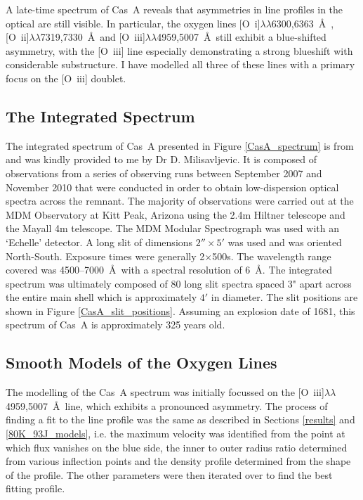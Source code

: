 A late-time spectrum of Cas~A reveals that asymmetries in line profiles in the optical are still visible.  In particular, the oxygen lines [O~{\sc i}]$\lambda\lambda$6300,6363~\AA\ , [O~{\sc ii}]$\lambda\lambda$7319,7330~\AA\  and [O~{\sc iii}]$\lambda\lambda$4959,5007~\AA\  still exhibit a blue-shifted asymmetry, with the [O~{\sc iii}] line especially demonstrating a strong blueshift with considerable substructure.  I have modelled all three of these lines with a primary focus on the [O~{\sc iii}] doublet.

\subsection{The Integrated Spectrum}

The integrated spectrum of Cas~A presented in Figure \ref{CasA_spectrum} is from \citet{Milisavljevic2013} and was kindly provided to me by Dr D. Milisavljevic.  It is composed of observations from a series of observing runs between September 2007 and November 2010 that were conducted in order to obtain low-dispersion optical spectra across the remnant.  The majority of observations were carried out at the MDM Observatory at Kitt Peak, Arizona using the 2.4m Hiltner telescope and the Mayall 4m telescope.  The MDM Modular Spectrograph was used with an `Echelle' detector.  A long slit of dimensions $2''\times5'$ was used and was oriented North-South.  Exposure times were generally 2$\times$500s.  The wavelength range covered was 4500--7000~\AA\  with a spectral resolution of 6~\AA.  
The integrated spectrum was ultimately composed of 80 long slit spectra spaced 3" apart across the entire main shell which is approximately $4'$ in diameter.  The slit positions are shown in Figure \ref{CasA_slit_positions}.  Assuming an explosion date of 1681, this spectrum of Cas~A is approximately 325 years old.


\subsection{Smooth Models of the Oxygen Lines}
\label{scn:CasA_smooth}
The modelling of the Cas~A spectrum was initially focussed on the [O~{\sc iii}]$\lambda\lambda$4959,5007~\AA\  line, which exhibits a pronounced asymmetry.  The process of finding a fit to the line profile was the same as described in Sections \ref{results} and \ref{80K_93J_models}, i.e. the maximum velocity was identified from the point at which flux vanishes on the blue side, the inner to outer radius ratio determined from various inflection points and the density profile determined from the shape of the profile.  The other parameters were then iterated over to find the best fitting profile.  

